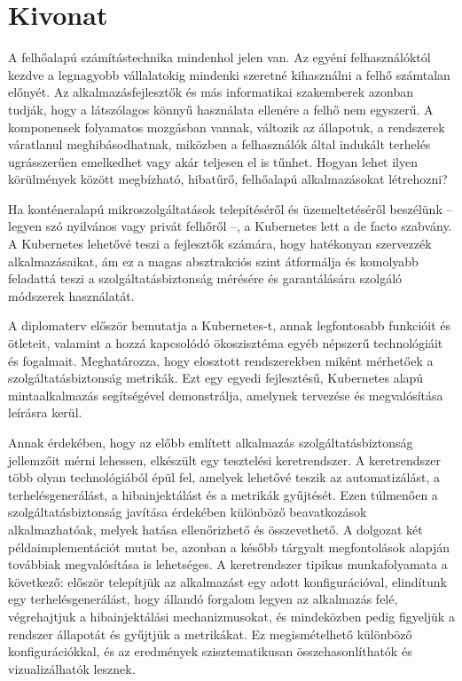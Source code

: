 \setcounter{page}{1}

\selecthungarian

\chapter*{Kivonat}

A felhőalapú számítástechnika mindenhol jelen van. Az egyéni felhasználóktól kezdve a legnagyobb vállalatokig mindenki szeretné kihasználni a felhő számtalan előnyét. Az alkalmazásfejlesztők és más informatikai szakemberek azonban tudják, hogy a látszólagos könnyű használata ellenére a felhő nem egyszerű. A komponensek folyamatos mozgásban vannak, változik az állapotuk, a rendszerek váratlanul meghibásodhatnak, miközben a felhasználók által indukált terhelés ugrásszerűen emelkedhet vagy akár teljesen el is tűnhet. Hogyan lehet ilyen körülmények között megbízható, hibatűrő, felhőalapú alkalmazásokat létrehozni?

Ha konténeralapú mikroszolgáltatások telepítéséről és üzemeltetéséről beszélünk -- legyen szó nyilvános vagy privát felhőről --, a Kubernetes lett a de facto szabvány. A Kubernetes lehetővé teszi a fejlesztők számára, hogy hatékonyan szervezzék alkalmazásaikat, ám ez a magas absztrakciós szint átformálja és komolyabb feladattá teszi a szolgáltatásbiztonság mérésére és garantálására szolgáló módszerek használatát.

A diplomaterv először bemutatja a Kubernetes-t, annak legfontosabb funkcióit és ötleteit, valamint a hozzá kapcsolódó ökoszisztéma egyéb népszerű technológiáit és fogalmait. Meghatározza, hogy elosztott rendszerekben miként mérhetőek a szolgáltatásbiztonság metrikák. Ezt egy egyedi fejlesztésű, Kubernetes alapú mintaalkalmazás segítségével demonstrálja, amelynek tervezése és megvalósítása leírásra kerül.

Annak érdekében, hogy az előbb említett alkalmazás szolgáltatásbiztonság jellemzőit mérni lehessen, elkészült egy tesztelési keretrendszer. A keretrendszer több olyan technológiából épül fel, amelyek lehetővé teszik az automatizálást, a terhelésgenerálást, a hibainjektálást és a metrikák gyűjtését. Ezen túlmenően a szolgáltatásbiztonság javítása érdekében különböző beavatkozások alkalmazhatóak, melyek hatása ellenőrizhető és összevethető. A dolgozat két példaimplementációt mutat be, azonban a később tárgyalt megfontolások alapján továbbiak megvalósítása is lehetséges. A keretrendszer tipikus munkafolyamata a következő: először telepítjük az alkalmazást egy adott konfigurációval, elindítunk egy terhelésgenerálást, hogy állandó forgalom legyen az alkalmazás felé, végrehajtjuk a hibainjektálási mechanizmusokat, és mindeközben pedig figyeljük a rendszer állapotát és gyűjtjük a metrikákat. Ez megismételhető különböző konfigurációkkal, és az eredmények szisztematikusan összehasonlíthatók és vizualizálhatók lesznek.


